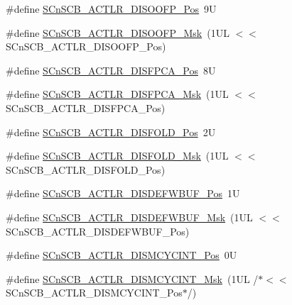 \begin{DoxyCompactItemize}
\#define \mbox{\hyperlink{group___c_m_s_i_s___s_cn_s_c_b_gaff0b57464c60fea8182b903676f8de49}{S\+Cn\+S\+C\+B\+\_\+\+A\+C\+T\+L\+R\+\_\+\+D\+I\+S\+O\+O\+F\+P\+\_\+\+Pos}}~9U
\item 
\#define \mbox{\hyperlink{group___c_m_s_i_s___s_cn_s_c_b_ga1ecd6adafa43464d7097b132c19e8640}{S\+Cn\+S\+C\+B\+\_\+\+A\+C\+T\+L\+R\+\_\+\+D\+I\+S\+O\+O\+F\+P\+\_\+\+Msk}}~(1\+U\+L $<$$<$ S\+Cn\+S\+C\+B\+\_\+\+A\+C\+T\+L\+R\+\_\+\+D\+I\+S\+O\+O\+F\+P\+\_\+\+Pos)
\item 
\#define \mbox{\hyperlink{group___c_m_s_i_s___s_cn_s_c_b_gaa194809383bc72ecf3416d85709281d7}{S\+Cn\+S\+C\+B\+\_\+\+A\+C\+T\+L\+R\+\_\+\+D\+I\+S\+F\+P\+C\+A\+\_\+\+Pos}}~8U
\item 
\#define \mbox{\hyperlink{group___c_m_s_i_s___s_cn_s_c_b_ga10d5aa4a196dcde6f476016ece2c1b69}{S\+Cn\+S\+C\+B\+\_\+\+A\+C\+T\+L\+R\+\_\+\+D\+I\+S\+F\+P\+C\+A\+\_\+\+Msk}}~(1\+U\+L $<$$<$ S\+Cn\+S\+C\+B\+\_\+\+A\+C\+T\+L\+R\+\_\+\+D\+I\+S\+F\+P\+C\+A\+\_\+\+Pos)
\item 
\#define \mbox{\hyperlink{group___c_m_s_i_s___s_cn_s_c_b_gaab395870643a0bee78906bb15ca5bd02}{S\+Cn\+S\+C\+B\+\_\+\+A\+C\+T\+L\+R\+\_\+\+D\+I\+S\+F\+O\+L\+D\+\_\+\+Pos}}~2U
\item 
\#define \mbox{\hyperlink{group___c_m_s_i_s___s_cn_s_c_b_gaa9dd2d4a2350499188f438d0aa9fd982}{S\+Cn\+S\+C\+B\+\_\+\+A\+C\+T\+L\+R\+\_\+\+D\+I\+S\+F\+O\+L\+D\+\_\+\+Msk}}~(1\+U\+L $<$$<$ S\+Cn\+S\+C\+B\+\_\+\+A\+C\+T\+L\+R\+\_\+\+D\+I\+S\+F\+O\+L\+D\+\_\+\+Pos)
\item 
\#define \mbox{\hyperlink{group___c_m_s_i_s___s_cn_s_c_b_gafa2eb37493c0f8dae77cde81ecf80f77}{S\+Cn\+S\+C\+B\+\_\+\+A\+C\+T\+L\+R\+\_\+\+D\+I\+S\+D\+E\+F\+W\+B\+U\+F\+\_\+\+Pos}}~1U
\item 
\#define \mbox{\hyperlink{group___c_m_s_i_s___s_cn_s_c_b_ga6cda7b7219232a008ec52cc8e89d5d08}{S\+Cn\+S\+C\+B\+\_\+\+A\+C\+T\+L\+R\+\_\+\+D\+I\+S\+D\+E\+F\+W\+B\+U\+F\+\_\+\+Msk}}~(1\+U\+L $<$$<$ S\+Cn\+S\+C\+B\+\_\+\+A\+C\+T\+L\+R\+\_\+\+D\+I\+S\+D\+E\+F\+W\+B\+U\+F\+\_\+\+Pos)
\item 
\#define \mbox{\hyperlink{group___c_m_s_i_s___s_cn_s_c_b_gaaa3e79f5ead4a32c0ea742b2a9ffc0cd}{S\+Cn\+S\+C\+B\+\_\+\+A\+C\+T\+L\+R\+\_\+\+D\+I\+S\+M\+C\+Y\+C\+I\+N\+T\+\_\+\+Pos}}~0U
\item 
\#define \mbox{\hyperlink{group___c_m_s_i_s___s_cn_s_c_b_ga2a2818f0489ad10b6ea2964e899d4cbc}{S\+Cn\+S\+C\+B\+\_\+\+A\+C\+T\+L\+R\+\_\+\+D\+I\+S\+M\+C\+Y\+C\+I\+N\+T\+\_\+\+Msk}}~(1\+U\+L /$\ast$$<$$<$ S\+Cn\+S\+C\+B\+\_\+\+A\+C\+T\+L\+R\+\_\+\+D\+I\+S\+M\+C\+Y\+C\+I\+N\+T\+\_\+\+Pos$\ast$/)

\end{DoxyCompactItemize}
